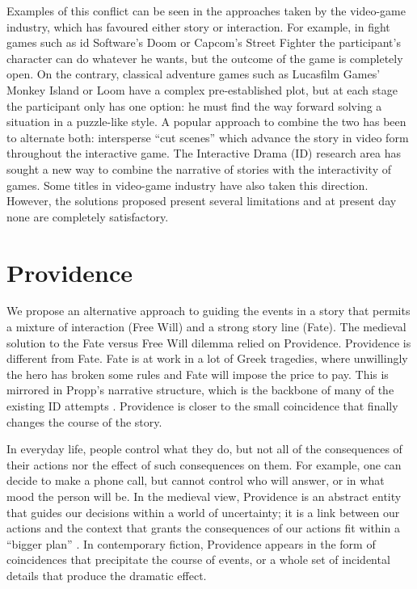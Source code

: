 \documentclass[
		twoside,openright,titlepage,numbers=noenddot,manychapters,
		headinclude,%
                footinclude=false,cleardoublepage=empty,
                BCOR=5mm,
		fontsize=11pt, %
                 enabledeprecatedfontcommands]{scrreprt}
\begin{document}
Examples of this conflict can be seen in the approaches taken by the video-game industry, which has favoured either story or interaction. For example, in fight games such as id Software’s Doom or Capcom’s Street Fighter the participant’s character can do whatever he wants, but the outcome of the game is completely open. On the contrary, classical adventure games such as Lucasfilm Games’ Monkey Island or Loom have a complex pre-established plot, but at each stage the participant only has one option: he must find the way forward solving a situation in a puzzle-like style. A popular approach to combine the two has been to alternate both: intersperse “cut scenes” which advance the story in video form throughout the interactive game. The Interactive Drama (ID) research area has sought a new way to combine the narrative of stories with the interactivity of games. Some titles in video-game industry have also taken this direction. However, the solutions proposed present several limitations and at present day none are completely satisfactory.  %



\section{Providence}
We propose an alternative approach to guiding the events in a story that permits a mixture of interaction (Free Will) and a strong story line (Fate). The medieval solution to the Fate versus Free Will dilemma relied on Providence. Providence is different from Fate. Fate is at work in a lot of Greek tragedies, where unwillingly the hero has broken some rules and Fate will impose the price to pay. This is mirrored in Propp's narrative structure, which is the backbone of many of the existing ID attempts \cite[]{Glassner2004}. Providence is closer to the small coincidence that finally changes the course of the story. 

In everyday life, people control what they do, but not all of the consequences of their actions nor the effect of such consequences on them. For example, one can decide to make a phone call, but cannot control who will answer, or in what mood the person will be. In the medieval view, Providence is an abstract entity that guides our decisions within a world of uncertainty; it is a link between our actions and the context that grants the consequences of our actions fit within a “bigger plan” \cite[]{McCann}. In contemporary fiction, Providence appears in the form of coincidences that precipitate the course of events, or a whole set of incidental details that produce the dramatic effect.  
\end{document}
